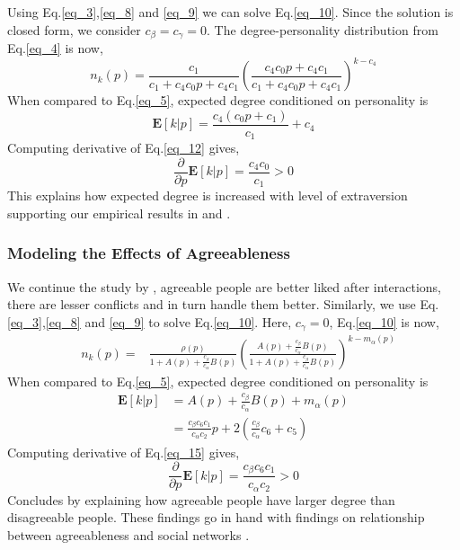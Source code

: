 \documentclass[runningheads]{llncs}
\begin{document}
Using Eq.\ref{eq_3},\ref{eq_8} and \ref{eq_9} we can solve Eq.\ref{eq_10}. Since the solution is closed form, we consider $c_\beta = c_\gamma = 0$. The degree-personality distribution from Eq.\ref{eq_4} is now,
\begin{equation}\label{eq_11}
n_{k}(p)=\frac{c_{1}}{c_{1}+c_{4} c_{0} p+c_{4} c_{1}}\left(\frac{c_{4} c_{0} p+c_{4} c_{1}}{c_{1}+c_{4} c_{0} p+c_{4} c_{1}}\right)^{k-c_{4}}\end{equation}
When compared to Eq.\ref{eq_5}, expected degree conditioned on personality is
\begin{equation}\label{eq_12}
\mathbf{E}[k | p]=\frac{c_{4}\left(c_{0} p+c_{1}\right)}{c_{1}}+c_{4}\end{equation}
Computing derivative of Eq.\ref{eq_12} gives,
\begin{equation}\label{eq_13}
\frac{\partial}{\partial p} \mathbf{E}[k | p]=\frac{c_{4} c_{0}}{c_{1}}>0\end{equation}
This explains how expected degree is increased with level of extraversion supporting our empirical results in \cite{ref_4} and \cite{ref_6}.

\subsubsection{Modeling the Effects of Agreeableness}
We continue the study by \cite{ref_16}, agreeable people are better liked after interactions, there are lesser conflicts and in turn handle them better. Similarly, we use Eq.\ref{eq_3},\ref{eq_8} and \ref{eq_9} to solve Eq.\ref{eq_10}. Here, $c_\gamma=0$, Eq.\ref{eq_10} is now,
\begin{equation}\label{eq_14}
\begin{aligned}
&n_{k}(p)=
&\frac{\rho(p)}{1+A(p)+\frac{c_{\beta}}{c_{\alpha}} B(p)}\left(\frac{A(p)+\frac{c_{\beta}}{c_{\alpha}} B(p)}{1+A(p)+\frac{c_{\beta}}{c_{\alpha}} B(p)}\right)^{k-m_{\alpha}(p)}
\end{aligned}\end{equation}
When compared to Eq.\ref{eq_5}, expected degree conditioned on personality is 
\begin{equation}\label{eq_15}
\begin{aligned}
\mathbf{E}[k | p] &=A(p)+\frac{c_{\beta}}{c_{\alpha}} B(p)+m_{\alpha}(p) \\
&=\frac{c_{\beta} c_{6} c_{1}}{c_{\alpha} c_{2}} p+2\left(\frac{c_{\beta}}{c_{\alpha}} c_{6}+c_{5}\right)
\end{aligned}\end{equation}
Computing derivative of Eq.\ref{eq_15} gives,
\begin{equation}\label{eq_16}
\frac{\partial}{\partial p} \mathbf{E}[k | p]=\frac{c_{\beta} c_{6} c_{1}}{c_{\alpha} c_{2}}>0\end{equation}
Concludes by explaining how agreeable people have larger degree than disagreeable people. These findings go in hand with findings on relationship between agreeableness and social networks \cite{ref_7,ref_8}.
\end{document}
